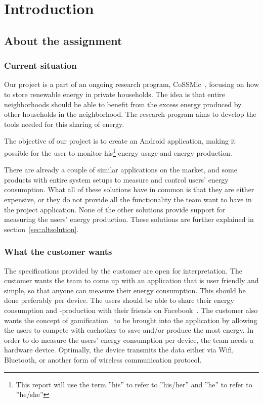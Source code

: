 \chapter{Introduction}

\section{About the assignment}
\subsection{Current situation}
Our project is a part of an ongoing research program, CoSSMic~\cite{cossmic}, focusing on how to store renewable energy in private households. The idea is that entire neighborhoods should be able to benefit from the excess energy produced by other households in the neighborhood. The research program aims to develop the tools needed for this sharing of energy. 

The objective of our project is to create an Android application, making it possible for the user to monitor his\footnote{This report will use the term ''his'' to refer to ''his/her'' and ''he'' to refer to ''he/she''} energy usage and energy production. 

There are already a couple of similar applications on the market, and some products with entire system setups to measure and control users' energy consumption. What all of these solutions have in common is that they are either expensive, or they do not provide all the functionality the team want to have in the project application. None of the other solutions provide support for measuring the users' energy production. These solutions are further explained in section~\ref{sec:altsolution}.

\subsection{What the customer wants}
The specifications provided by the customer are open for interpretation. The customer wants the team to come up with an application that is user friendly and simple, so that anyone can measure their energy consumption. This should be done preferably per device. The users should be able to share their energy consumption and -production with their friends on Facebook~\cite{facebook}. The customer also wants the concept of gamification~\cite{gamification} to be brought into the application by allowing the users to compete with eachother to save and/or produce the most energy. In order to do measure the users' energy consumption per device, the team needs a hardware device. Optimally, the device transmits the data either via Wifi, Bluetooth, or another form of wireless communication protocol. 

